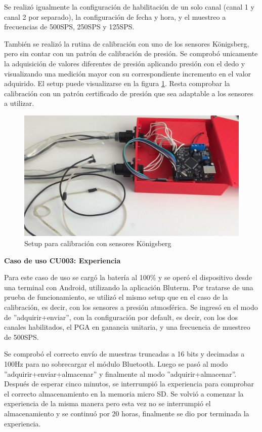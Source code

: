 Se realizó igualmente la configuración de habilitación de un solo canal (canal 1 y canal 2 por separado), la configuración de fecha y hora, y el muestreo a frecuencias de 500SPS, 250SPS y 125SPS.

También se realizó la rutina de calibración con uno de los sensores Königsberg, pero sin contar con un patrón de calibración de presión. Se comprobó unicamente la adquisición de valores diferentes de presión aplicando presión con el dedo y visualizando una medición mayor con su correspondiente incremento en el valor adquirido. El setup puede visualizarse en la figura \ref{fig:calibracion}. Resta comprobar la calibración con un patrón certificado de presión que sea adaptable a los sensores a utilizar. 

\begin{figure} [!htpb]
    \centering
    \includegraphics[width=\textwidth]{./Figures/calibracion.jpeg}
    \caption{Setup para calibración con sensores Königsberg}
    \label{fig:calibracion}
\end{figure}

\textbf{Caso de uso CU003: Experiencia}

Para este caso de uso se cargó la batería al 100\% y se operó el dispositivo desde una terminal con Android, utilizando la aplicación Bluterm. Por tratarse de una prueba de funcionamiento, se utilizó el mismo setup que en el caso de la calibración, es decir, con los sensores a presión atmosférica. Se ingresó en el modo de ''adquirir+enviar'', con la configuración por default, es decir, con los dos canales habilitados, el PGA en ganancia unitaria, y una frecuencia de muestreo de 500SPS. 

Se comprobó el correcto envío de muestras truncadas a 16 bits y decimadas a 100Hz para no sobrecargar el módulo Bluetooth. Luego se pasó al modo ''adquirir+enviar+almacenar'' y finalmente al modo ''adquirir+almacenar''. Después de esperar cinco minutos, se interrumpió la experiencia para comprobar el correcto almacenamiento en la memoria micro SD. 
Se volvió a comenzar la experiencia de la misma manera pero esta vez no se interrumpió el almacenamiento y se continuó por 20 horas, finalmente se dio por terminada la experiencia. 

